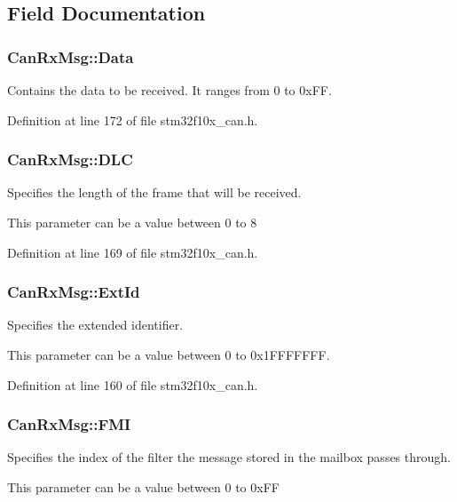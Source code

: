 \subsection{Field Documentation}
\hypertarget{struct_can_rx_msg_a5c2e882cc599421bc40cac1618ddfe07}{
\subsubsection[{Data}]{ Can\-Rx\-Msg\-::\-Data}}\label{struct_can_rx_msg_a5c2e882cc599421bc40cac1618ddfe07}
Contains the data to be received. It ranges from 0 to 0x\-F\-F. 

Definition at line 172 of file stm32f10x\-\_\-can.\-h.

\hypertarget{struct_can_rx_msg_abf77d3abf9ad290c08cdfd5d99ebc745}{
\subsubsection[{D\-L\-C}]{ Can\-Rx\-Msg\-::\-D\-L\-C}}\label{struct_can_rx_msg_abf77d3abf9ad290c08cdfd5d99ebc745}
\begin{DoxyVerb}     Specifies the length of the frame that will be received.
\end{DoxyVerb}
 This parameter can be a value between 0 to 8 

Definition at line 169 of file stm32f10x\-\_\-can.\-h.

\hypertarget{struct_can_rx_msg_a1fdca10d31c81eea2ccef41d2aced562}{
\subsubsection[{Ext\-Id}]{ Can\-Rx\-Msg\-::\-Ext\-Id}}\label{struct_can_rx_msg_a1fdca10d31c81eea2ccef41d2aced562}
\begin{DoxyVerb}  Specifies the extended identifier.
\end{DoxyVerb}
 This parameter can be a value between 0 to 0x1\-F\-F\-F\-F\-F\-F\-F. 

Definition at line 160 of file stm32f10x\-\_\-can.\-h.

\hypertarget{struct_can_rx_msg_a5afe39d8e295659eeb3030593828b96a}{
\subsubsection[{F\-M\-I}]{ Can\-Rx\-Msg\-::\-F\-M\-I}}\label{struct_can_rx_msg_a5afe39d8e295659eeb3030593828b96a}
\begin{DoxyVerb}     Specifies the index of the filter the message stored in the mailbox passes through.
\end{DoxyVerb}
 This parameter can be a value between 0 to 0x\-F\-F

